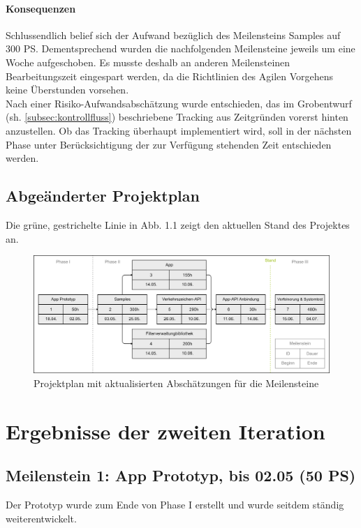 \documentclass[12pt,a4paper,ngerman,enabledeprecatedfontcommands]{scrreprt}
\begin{document}
\subsubsection*{Konsequenzen}
Schlussendlich belief sich der Aufwand bezüglich des Meilensteins \glqq{}Samples\grqq{} auf 300 PS. Dementsprechend wurden die nachfolgenden Meilensteine jeweils um eine Woche aufgeschoben. Es musste deshalb an anderen Meilensteinen Bearbeitungszeit eingespart werden, da die Richtlinien des Agilen Vorgehens keine Überstunden vorsehen.\\
Nach einer Risiko-Aufwandsabschätzung wurde entschieden, das im Grobentwurf (sh. \cref{subsec:kontrollfluss}) beschriebene \gls{Tracking} aus Zeitgründen vorerst hinten anzustellen. Ob das \gls{Tracking} überhaupt implementiert wird, soll in der nächsten Phase unter Berücksichtigung der zur Verfügung stehenden Zeit entschieden werden.\\

\section{Abgeänderter Projektplan}

Die grüne, gestrichelte Linie in Abb. 1.1 zeigt den aktuellen Stand des Projektes an.\\
\begin{figure}[H]
\centering
\includegraphics[width=1\linewidth]{Reviewdokument/Grafiken/project_plan_v2.png}
\caption{Projektplan mit aktualisierten Abschätzungen für die Meilensteine}
\end{figure}

\chapter{Ergebnisse der zweiten Iteration}

\section[Meilenstein 1: App Prototyp]{Meilenstein 1: App Prototyp, bis 02.05 (50 PS)}
Der Prototyp wurde zum Ende von Phase I erstellt und wurde seitdem ständig weiterentwickelt.\\
\end{document}
